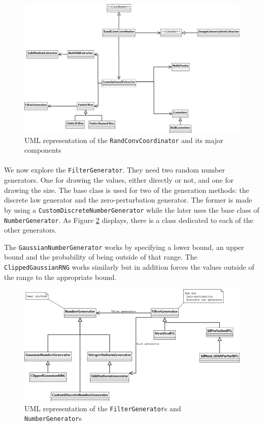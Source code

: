 \documentclass[a4paper]{report}
\begin{document}
		
		\begin{figure}
			\centering
				\includegraphics[width=1.00\textwidth]{images/uml-RandConvCoord.png}
			\caption{UML representation of the \texttt{RandConvCoordinator} and its major components}
			\label{fig:uml-ConvolutionalExtractor}
		\end{figure}
		

		
		
		\paragraph{}
		We now explore the \texttt{FilterGenerator}. They need two random number generators. One for drawing the values, either directly or not, and one for drawing the size. The base class is used for two of the generation methods: the discrete law generator and the zero-perturbation generator. The former is made by using a \texttt{CustomDiscreteNumberGenerator} while the later uses the base class of \texttt{NumberGenerator}. 
		As Figure \ref{fig:uml-filtergen} displays, there is a class dedicated to each of the other generators.
		\par
		The \texttt{GaussianNumberGenerator} works by specifying a lower bound, an upper bound and the probability of being outside of that range. The \texttt{ClippedGaussianRNG} works similarly but in addition forces the values outside of the range to the appropriate bound.
		
		
		\begin{figure}
			\centering
				\includegraphics[width=1.00\textwidth]{images/uml-filtergen.png}
			\caption{UML representation of the \texttt{FilterGenerator}s and \texttt{NumberGenerator}s}
			\label{fig:uml-filtergen}
		\end{figure}
		
\end{document}
